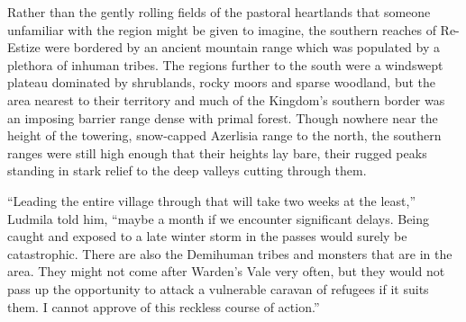  

Rather than the gently rolling fields of the pastoral heartlands that someone unfamiliar with the region might be given to imagine, the southern reaches of Re-Estize were bordered by an ancient mountain range which was populated by a plethora of inhuman tribes. The regions further to the south were a windswept plateau dominated by shrublands, rocky moors and sparse woodland, but the area nearest to their territory and much of the Kingdom's southern border was an imposing barrier range dense with primal forest. Though nowhere near the height of the towering, snow-capped Azerlisia range to the north, the southern ranges were still high enough that their heights lay bare, their rugged peaks standing in stark relief to the deep valleys cutting through them.

 

“Leading the entire village through that will take two weeks at the least,” Ludmila told him, “maybe a month if we encounter significant delays. Being caught and exposed to a late winter storm in the passes would surely be catastrophic. There are also the Demihuman tribes and monsters that are in the area. They might not come after Warden’s Vale very often, but they would not pass up the opportunity to attack a vulnerable caravan of refugees if it suits them. I cannot approve of this reckless course of action.”